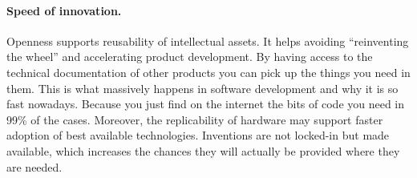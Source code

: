 \documentclass{article}
\begin{document}
{\paragraph{Speed of innovation.} Openness supports reusability of intellectual assets. It helps avoiding ``reinventing the wheel'' and accelerating product development. By having access to the technical documentation of other products you can pick up the things you need in them. This is what massively happens in software development and why it is so fast nowadays. Because you just find on the internet the bits of code you need in 99\% of the cases. Moreover, the replicability of hardware may support faster adoption of best available technologies. Inventions are not locked-in but made available, which increases the chances they will actually be provided where they are needed.}
\end{document}
